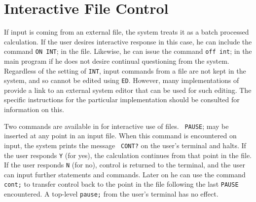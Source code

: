 \section{Interactive File Control}
\hypertarget{switch:INT}{}
If input is coming from an external file, the system treats it as a batch
processed calculation.  If the user desires interactive
 response in this case, he can include the command
\texttt{ON INT}; in the file.  Likewise, he can issue the
command {\tt off int}; in the main program if he does not desire continual
questioning from the system.  Regardless of the setting of {\tt INT},
input commands from a file are not kept in the system, and so cannot be
edited using {\tt ED}.  However, many implementations of {\REDUCE} provide
a link to an external system editor that can be used for such editing.
The specific instructions for the particular implementation should be
consulted for information on this.

\hypertarget{CONT-and-PAUSE}{}
Two commands are available in {\REDUCE} for interactive use of files. {\tt
PAUSE}; may be inserted at any point in an input file.  When
this command is encountered on input, the system prints the message {\tt
CONT?} on the user's terminal and halts.  If the user responds {\tt Y}
(for yes), the calculation continues from that point in the file.  If the
user responds {\tt N} (for no), control is returned to the terminal, and
the user can input further statements and commands.  Later on he can use
the command {\tt cont;} to transfer control back to the
point in the file following the last {\tt PAUSE} encountered.  A top-level
{\tt pause;} from the user's terminal has no effect.


